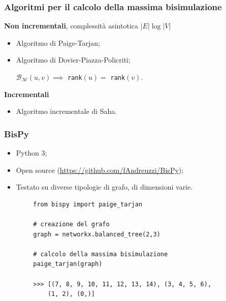 \documentclass{beamer}
\begin{document}
\begin{frame}\frametitle{Algoritmi per il calcolo della massima bisimulazione}
    \textbf{Non incrementali}, complessità asintotica $|E| \log |V|$
    \begin{itemize}
        \item Algoritmo di Paige-Tarjan;
        \item Algoritmo di Dovier-Piazza-Policriti;

        \qquad $\mathcal{B}_\mathcal{M}(u,v) \implies$ \texttt{rank}$(u) =$ \texttt{rank}$(v)$.
    \end{itemize}

    \bigskip

    \textbf{Incrementali}
    \begin{itemize}
        \item Algoritmo incrementale di Saha.
    \end{itemize}
\end{frame}

\begin{frame}[fragile]\frametitle{BisPy}
    \begin{itemize}
        \item Python 3;
        \item Open source (\url{https://github.com/fAndreuzzi/BisPy});
        \item Testato su diverse tipologie di grafo, di dimensioni varie.
    \end{itemize}

    \begin{example}
        \begin{verbatim}
        from bispy import paige_tarjan

        # creazione del grafo
        graph = networkx.balanced_tree(2,3)

        # calcolo della massima bisimulazione
        paige_tarjan(graph)

        >>> [(7, 8, 9, 10, 11, 12, 13, 14), (3, 4, 5, 6),
            (1, 2), (0,)]
        \end{verbatim}
    \end{example}
\end{frame}
\end{document}
